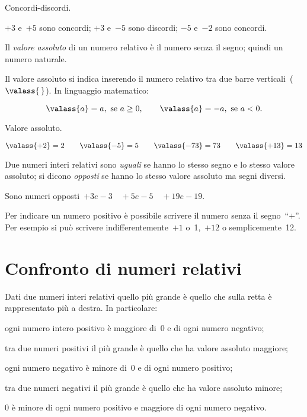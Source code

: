 \begin{exrig}
 \begin{esempio}
 Concordi-discordi.
 
\(+3\) e~\(+5\) sono concordi; \quad 
\(+3\) e~\(-5\) sono discordi; \quad 
\(-5\) e~\(-2\) sono concordi.
\end{esempio}
\end{exrig}

\begin{definizione}
Il \emph{valore assoluto} di un numero relativo è il numero senza il segno; 
quindi un numero naturale.
\end{definizione}

Il valore assoluto si indica inserendo il numero relativo tra due barre 
verticali~(\(\valass{\,}\)). In linguaggio
matematico:

\[ \valass{a}=a,\text{ se }a\ge0,\qquad \valass{a}=-a,\text{ se }a<0.\]

\begin{exrig}
 \begin{esempio}
 Valore assoluto.
 
\(\valass{+2}=2 \qquad \valass{-5}=5 \qquad 
 \valass{-73}=73 \qquad \valass{+13}=13\)
 \end{esempio}
\end{exrig}

\begin{definizione}
 Due numeri interi relativi sono \emph{uguali} se hanno lo stesso segno e lo 
stesso valore assoluto;
 si dicono \emph{opposti} se hanno lo stesso valore assoluto ma segni diversi.
\end{definizione}

Sono numeri opposti~\(+3 e -3 \quad +5 e -5 \quad +19 e -19\).

\osservazione Per indicare un numero positivo è possibile scrivere il numero 
senza il segno~``\(+\)''.
Per esempio si può scrivere indifferentemente~\(+1\) o~1,~\(+12\) o 
semplicemente~12.

\section{Confronto di numeri relativi}
\label{sec:02_confronto}

Dati due numeri interi relativi quello più grande è quello che sulla retta è 
rappresentato più a destra.
In particolare:
 \begin{enumeratea}
 \item ogni numero intero positivo è maggiore di~0 e di ogni numero negativo;
 \item tra due numeri positivi il più grande è quello che ha valore assoluto 
maggiore;
 \item ogni numero negativo è minore di~0 e di ogni numero positivo;
 \item tra due numeri negativi il più grande è quello che ha valore assoluto 
minore;
 \item 0 è minore di ogni numero positivo e maggiore di ogni numero negativo.
 \end{enumeratea}

